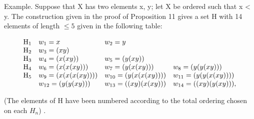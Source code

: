 Example. Suppose that X has two elements x, y; let X be ordered such that x < y. The construction given in the proof of Proposition 11 gives a set H with 14 elements of length \(\leqslant 5\) given in the following table:

\[
\begin{array}{l l l l} \mathrm{H} _ {1} & w _ {1} = x & w _ {2} = y \\ \mathrm{H} _ {2} & w _ {3} = (x y) \\ \mathrm{H} _ {3} & w _ {4} = (x (x y)) & w _ {5} = (y (x y)) \\ \mathrm{H} _ {4} & w _ {6} = (x (x (x y))) & w _ {7} = (y (x (x y))) & w _ {8} = (y (y (x y))) \\ \mathrm{H} _ {5} & w _ {9} = (x (x (x (x y)))) & w _ {10} = (y (x (x (x y)))) & w _ {11} = (y (y (x (x y)))) \\ & w _ {12} = (y (y (x y))) & w _ {13} = ((x y) (x (x y))) & w _ {14} = ((x y) (y (x y))), \end{array}
\]

(The elements of H have been numbered according to the total ordering chosen on each \(H_{n}\)) .

